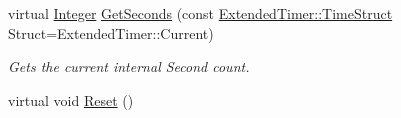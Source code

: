 \begin{DoxyCompactItemize}
virtual \hyperlink{namespaceMezzanine_ac3576e52af3c62d13dde94829e0c5465}{Integer} \hyperlink{classMezzanine_1_1ExtendedTimer_aa7fb648a0807f7102cb72983d6e9038f}{GetSeconds} (const \hyperlink{classMezzanine_1_1ExtendedTimer_a52119e2da54ea7ae5da0dc1f921a3b61}{ExtendedTimer::TimeStruct} Struct=ExtendedTimer::Current)
\begin{DoxyCompactList}\small\item\em Gets the current internal Second count. \item\end{DoxyCompactList}\item 
\hypertarget{classMezzanine_1_1ExtendedTimer_ac2781423c8f7d888e05443aeb5244e0a}{
virtual void \hyperlink{classMezzanine_1_1ExtendedTimer_ac2781423c8f7d888e05443aeb5244e0a}{Reset} ()}
\label{classMezzanine_1_1ExtendedTimer_ac2781423c8f7d888e05443aeb5244e0a}


\end{DoxyCompactItemize}
